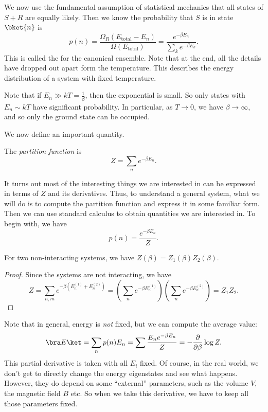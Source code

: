 \documentclass[a4paper]{article}
\begin{document}
We now use the fundamental assumption of statistical mechanics that all states of $S + R$ are equally likely. Then we know the probability that $S$ is in state $\bket{n}$ is
\[
  p(n) =\frac{\Omega_R(E_{\mathrm{total}} - E_n)}{\Omega(E_{\mathrm{total}})} = \frac{e^{-\beta E_n}}{\sum_k e^{-\beta E_k}}.
\]
This is called the  for the canonical ensemble. Note that at the end, all the details have dropped out apart form the temperature. This describes the energy distribution of a system with fixed temperature.

Note that if $E_n \gg kT = \frac{1}{\beta}$, then the exponential is small. So only states with $E_n \sim kT$ have significant probability. In particular, as $T \to 0$, we have $\beta \to \infty$, and so only the ground state can be occupied.

We now define an important quantity.
\begin{defi}
  The \emph{partition function} is
  \[
    Z = \sum_n e^{-\beta E_n}.
  \]
\end{defi}
It turns out most of the interesting things we are interested in can be expressed in terms of $Z$ and its derivatives. Thus, to understand a general system, what we will do is to compute the partition function and express it in some familiar form. Then we can use standard calculus to obtain quantities we are interested in. To begin with, we have
\[
  p(n) = \frac{e^{-\beta E_n}}{Z}.
\]
\begin{prop}
  For two non-interacting systems, we have $Z(\beta) = Z_1(\beta) Z_2(\beta)$.
\end{prop}

\begin{proof}
  Since the systems are not interacting, we have
  \[
    Z = \sum_{n, m} e^{-\beta (E_n^{(1)} + E_n^{(2)})} = \left(\sum_n e^{-\beta E_n^{(1)}}\right)\left(\sum_n e^{-\beta E_n^{(2)}}\right) = Z_1 Z_2.
  \]
\end{proof}

Note that in general, energy is \emph{not} fixed, but we can compute the average value:
\[
  \bra E\ket = \sum_n p(n) E_n = \sum \frac{E_n e^{-\beta E_n}}{Z} = -\frac{\partial}{\partial \beta} \log Z.
\]
This partial derivative is taken with all $E_i$ fixed. Of course, in the real world, we don't get to directly change the energy eigenstates and see what happens. However, they do depend on some ``external'' parameters, such as the volume $V$, the magnetic field $B$ etc. So when we take this derivative, we have to keep all those parameters fixed.
\end{document}
